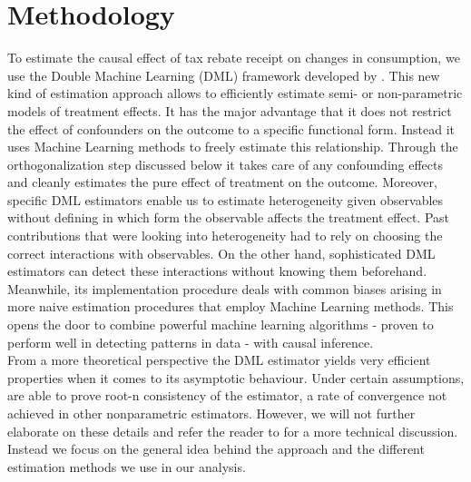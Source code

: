 \section{Methodology} \label{sec:methodology}
To estimate the causal effect of tax rebate receipt on changes in consumption, we use the Double Machine Learning (DML) framework developed by \cite{DML2017}. This new kind of estimation approach allows to efficiently estimate semi- or non-parametric models of treatment effects. It has the major advantage that it does not restrict the effect of confounders on the outcome to a specific functional form. Instead it uses Machine Learning methods to freely estimate this relationship. Through the orthogonalization step discussed below it takes care of any confounding effects and cleanly estimates the pure effect of treatment on the outcome. Moreover, specific DML estimators enable us to estimate heterogeneity given observables without defining in which form the observable affects the treatment effect. Past contributions that were looking into heterogeneity had to rely on choosing the correct interactions with observables. On the other hand, sophisticated DML estimators can detect these interactions without knowing them beforehand. \\
Meanwhile, its implementation procedure deals with common biases arising in more naive estimation procedures that employ Machine Learning methods. This opens the door to combine powerful machine learning algorithms - proven to perform well in detecting patterns in data - with causal inference. \\
From a more theoretical perspective the DML estimator yields very efficient properties when it comes to its asymptotic behaviour. Under certain assumptions, \cite{DML2017} are able to prove root-n consistency of the estimator, a rate of convergence not achieved in other nonparametric estimators. However, we will not further elaborate on these details and refer the reader to \cite{DML2017} for a more technical discussion. Instead we focus on the general idea behind the approach and the different estimation methods we use in our analysis.

